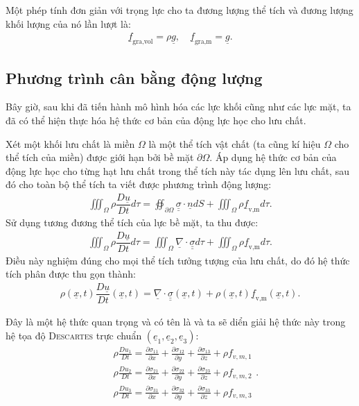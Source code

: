 \documentclass[../../../main.tex]{subfiles}
\begin{document}
	Một phép tính đơn giản với trọng lực cho ta đương lượng thể tích và đương lượng khối lượng của nó lần lượt là:
		\begin{align}
			\underline{f}_{\text{gra,vol}}=\rho\underline{g},\quad\underline{f}_{\text{gra,m}}=\underline{g}.
		\end{align}
\subsection{Phương trình cân bằng động lượng}
	Bây giờ, sau khi đã tiến hành mô hình hóa các lực khối cũng như các lực mặt, ta đã có thể hiện thực hóa hệ thức cơ bản của động lực học cho lưu chất.

	Xét một khối lưu chất là miền $\Omega$ là một thể tích vật chất (ta cũng kí hiệu $\Omega$ cho thể tích của miền) được giới hạn bởi bề mặt $\partial\Omega$. Áp dụng hệ thức cơ bản của động lực học cho từng hạt lưu chất trong thể tích này tác dụng lên lưu chất, sau đó cho toàn bộ thể tích ta viết được phương trình động lượng:
		\begin{align}
			\iiint_{\Omega}\rho\dfrac{D\underline{u}}{Dt}d\tau=\oiint_{\partial\Omega}\underline{\underline{\sigma}}\cdot\underline{n}dS+\iiint_{\Omega}\rho\underline{f}_{\text{v,m}}d\tau.
		\end{align}
	Sử dụng tương đương thể tích của lực bề mặt, ta thu được:
		\begin{align}
			\iiint_{\Omega}\rho\dfrac{D\underline{u}}{Dt}d\tau=\iiint_{\Omega}\underline{\nabla}\cdot\underline{\underline{\sigma}}d\tau+\iiint_{\Omega}\rho\underline{f}_{\text{v,m}}d\tau.
		\end{align}
	Điều này nghiệm đúng cho mọi thể tích tưởng tượng của lưu chất, do đó hệ thức tích phân được thu gọn thành:
		\begin{align}
			\boxed{\rho\left(\underline{x},t\right)\dfrac{D\underline{u}}{Dt}\left(\underline{x},t\right)=\underline{\nabla}\cdot\underline{\underline{\sigma}}\left(\underline{x},t\right)+\rho\left(\underline{x},t\right)\underline{f}_{\text{v,m}}\left(\underline{x},t\right)}.
		\end{align}

	Đây là một hệ thức quan trọng và có tên là  và ta sẽ diển giải hệ thức này trong hệ tọa độ \textsc{Descartes} trực chuẩn $(\underline{e}_1,\underline{e}_2,\underline{e}_3)$:
		\begin{equation}
			\boxed{\begin{aligned}
					&\rho\frac{Du_{1}}{Dt}=\frac{\partial\sigma_{11}}{\partial x}+\frac{\partial\sigma_{12}}{\partial y}+\frac{\partial\sigma_{13}}{\partial z}+\rho f_{v,m,1}\\
					&\rho\frac{Du_{2}}{Dt}=\frac{\partial\sigma_{21}}{\partial x}+\frac{\partial\sigma_{22}}{\partial y}+\frac{\partial\sigma_{23}}{\partial z}+\rho f_{v,m,2}\\
					&\rho\frac{Du_{3}}{Dt}=\frac{\partial\sigma_{31}}{\partial x}+\frac{\partial\sigma_{32}}{\partial y}+\frac{\partial\sigma_{33}}{\partial z}+\rho f_{v,m,3}
				\end{aligned}}.
		\end{equation}
\end{document}
